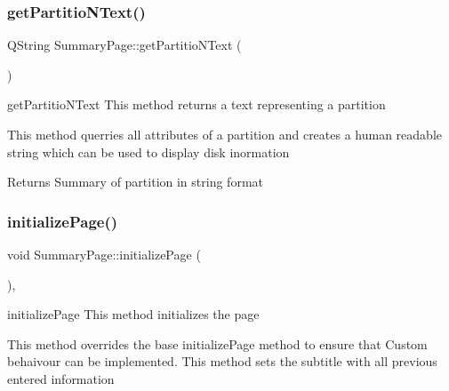 \subsubsection{\texorpdfstring{get\+Partitio\+N\+Text()}{getPartitioNText()}}
{\footnotesize\ttfamily Q\+String Summary\+Page\+::get\+Partitio\+N\+Text (\begin{DoxyParamCaption}{ }\end{DoxyParamCaption})\hspace{0.3cm}{\ttfamily [private]}}



get\+Partitio\+N\+Text This method returns a text representing a partition 

This method querries all attributes of a partition and creates a human readable string which can be used to display disk inormation \begin{DoxyReturn}{Returns}
Summary of partition in string format 
\end{DoxyReturn}
\mbox{\label{classui_1_1wizard_1_1pages_1_1_summary_page_a987e9e51fef71237349acb3b47818737}} 
\subsubsection{\texorpdfstring{initialize\+Page()}{initializePage()}}
{\footnotesize\ttfamily void Summary\+Page\+::initialize\+Page (\begin{DoxyParamCaption}{ }\end{DoxyParamCaption})\hspace{0.3cm}{\ttfamily [override]}, {\ttfamily [protected]}}



initialize\+Page This method initializes the page 

This method overrides the base initialize\+Page method to ensure that Custom behaivour can be implemented. This method sets the subtitle with all previous entered information \mbox{\label{classui_1_1wizard_1_1pages_1_1_summary_page_a343463680aad6cf8357c9f13fe23e57d}} 
